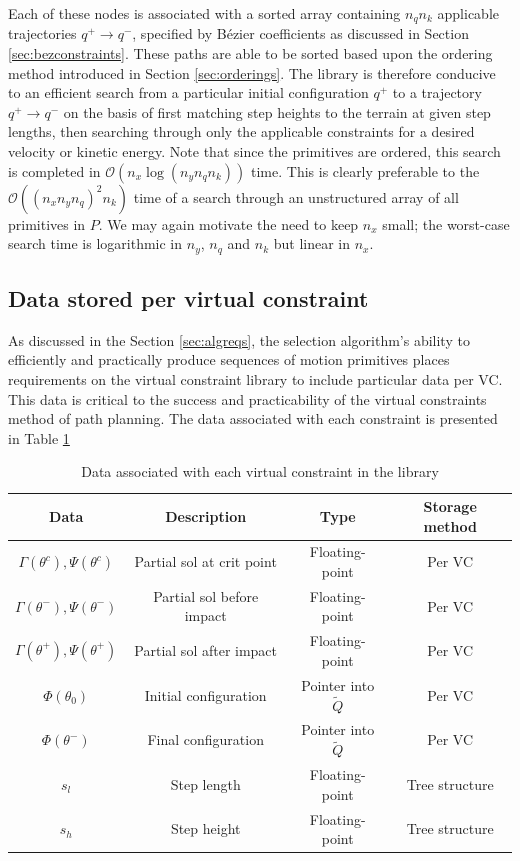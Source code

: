 Each of these nodes is associated with a sorted array containing $n_qn_k$ applicable trajectories $q^+ \to q^-$, specified by Bézier coefficients as discussed in Section \ref{sec:bezconstraints}. These paths are able to be sorted based upon the ordering method introduced in Section \ref{sec:orderings}. The library is therefore conducive to an efficient search from a particular initial configuration $q^+$ to a trajectory $q^+ \to q^-$ on the basis of first matching step heights to the terrain at given step lengths, then searching through only the applicable constraints for a desired velocity or kinetic energy. Note that since the primitives are ordered, this search is completed in $\mathcal{O}(n_x\log(n_yn_qn_k))$ time. This is clearly preferable to the $\mathcal{O}\left((n_xn_yn_q)^2n_k\right)$ time of a search through an unstructured array of all primitives in $P$. We may again motivate the need to keep $n_x$ small; the worst-case search time is logarithmic in $n_y$, $n_q$ and $n_k$ but linear in $n_x$.

\subsection{Data stored per virtual constraint}
As discussed in the Section \ref{sec:algreqs}, the selection algorithm's ability to efficiently and practically produce sequences of motion primitives places requirements on the virtual constraint library to include particular data per VC. This data is critical to the success and practicability of the virtual constraints method of path planning. The data associated with each constraint is presented in Table \ref{tab:datavc}

\begin{table}
	\centering
	\begin{tabular}{ c | c | c | c }
		Data                               & Description               & Type                      & Storage method \\ \hline
		$\Gamma(\theta^c), \Psi(\theta^c)$ & Partial sol at crit point & Floating-point            & Per VC         \\
		$\Gamma(\theta^-), \Psi(\theta^-)$ & Partial sol before impact & Floating-point            & Per VC         \\
		$\Gamma(\theta^+), \Psi(\theta^+)$ & Partial sol after impact  & Floating-point            & Per VC         \\
		$\Phi(\theta_0)$                   & Initial configuration     & Pointer into $\tilde{Q}$  & Per VC         \\
		$\Phi(\theta^-)$                   & Final configuration       & Pointer into $\tilde{Q}$  & Per VC         \\
		$s_l$                              & Step length               & Floating-point            & Tree structure \\
		$s_h$                              & Step height               & Floating-point            & Tree structure
	\end{tabular}
	\caption{Data associated with each virtual constraint in the library}
	\label{tab:datavc}
\end{table}

